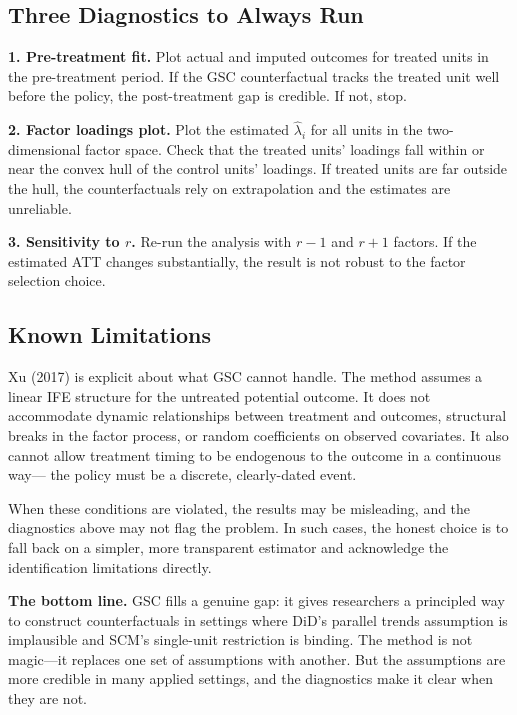 \documentclass[12pt]{article}
\begin{document}
\subsection{Three Diagnostics to Always Run}

\textbf{1. Pre-treatment fit.}
Plot actual and imputed outcomes for treated units in the pre-treatment period.
If the GSC counterfactual tracks the treated unit well before the policy,
the post-treatment gap is credible. If not, stop.

\textbf{2. Factor loadings plot.}
Plot the estimated $\hat{\lambda}_i$ for all units in the two-dimensional factor space.
Check that the treated units' loadings fall within or near the convex hull of the
control units' loadings.
If treated units are far outside the hull, the counterfactuals rely on extrapolation
and the estimates are unreliable.

\textbf{3. Sensitivity to $r$.}
Re-run the analysis with $r - 1$ and $r + 1$ factors.
If the estimated ATT changes substantially, the result is not robust to the
factor selection choice.

\subsection{Known Limitations}

Xu (2017) is explicit about what GSC cannot handle.
The method assumes a linear IFE structure for the untreated potential outcome.
It does not accommodate dynamic relationships between treatment and outcomes,
structural breaks in the factor process, or random coefficients on observed covariates.
It also cannot allow treatment timing to be endogenous to the outcome in a continuous way---
the policy must be a discrete, clearly-dated event.

When these conditions are violated, the results may be misleading,
and the diagnostics above may not flag the problem.
In such cases, the honest choice is to fall back on a simpler, more transparent
estimator and acknowledge the identification limitations directly.

\bigskip
\noindent
\textbf{The bottom line.}
GSC fills a genuine gap: it gives researchers a principled way to construct
counterfactuals in settings where DiD's parallel trends assumption is implausible
and SCM's single-unit restriction is binding.
The method is not magic---it replaces one set of assumptions with another.
But the assumptions are more credible in many applied settings,
and the diagnostics make it clear when they are not.
\end{document}
